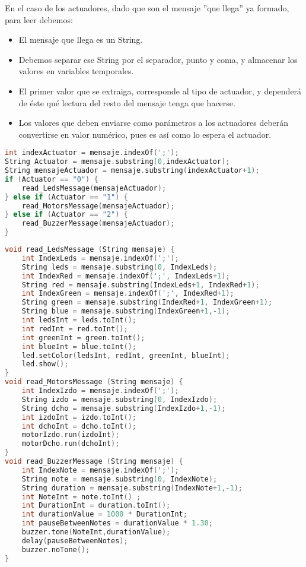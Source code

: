 En el caso de los actuadores, dado que son el mensaje ''que llega'' ya formado, para leer debemos:
\begin{itemize}
	\item El mensaje que llega es un String.
	\item Debemos separar ese String por el separador, punto y coma, y almacenar los valores en variables temporales. 
	\item El primer valor que se extraiga, corresponde al tipo de actuador, y dependerá de éste qué lectura del resto del mensaje tenga que hacerse. 
	\item Los valores que deben enviarse como parámetros a los actuadores deberán convertirse en valor numérico, pues es así como lo espera el actuador. 
\end{itemize} 
\begin{lstlisting}[language=C,caption={Decisión sobre los actuadores con el primer valor del mensaje},captionpos=b]
int indexActuator = mensaje.indexOf(';');
String Actuator = mensaje.substring(0,indexActuator);
String mensajeActuador = mensaje.substring(indexActuator+1);
if (Actuator == "0") {
	read_LedsMessage(mensajeActuador);
} else if (Actuator == "1") {
	read_MotorsMessage(mensajeActuador);
} else if (Actuator == "2") {
	read_BuzzerMessage(mensajeActuador);
}
\end{lstlisting}
\begin{lstlisting}[language=C,caption={Lectura de mensajes de los actuadores},captionpos=b]
void read_LedsMessage (String mensaje) {
	int IndexLeds = mensaje.indexOf(';');
	String leds = mensaje.substring(0, IndexLeds);
	int IndexRed = mensaje.indexOf(';', IndexLeds+1); 
	String red = mensaje.substring(IndexLeds+1, IndexRed+1);
	int IndexGreen = mensaje.indexOf(';', IndexRed+1);
	String green = mensaje.substring(IndexRed+1, IndexGreen+1);
	String blue = mensaje.substring(IndexGreen+1,-1); 
	int ledsInt = leds.toInt();
	int redInt = red.toInt();
	int greenInt = green.toInt();
	int blueInt = blue.toInt();
	led.setColor(ledsInt, redInt, greenInt, blueInt);
	led.show();
}	
void read_MotorsMessage (String mensaje) {
	int IndexIzdo = mensaje.indexOf(';');
	String izdo = mensaje.substring(0, IndexIzdo);
	String dcho = mensaje.substring(IndexIzdo+1,-1);	
	int izdoInt = izdo.toInt();
	int dchoInt = dcho.toInt();
	motorIzdo.run(izdoInt);
	motorDcho.run(dchoInt);
}
void read_BuzzerMessage (String mensaje) {
	int IndexNote = mensaje.indexOf(';');
	String note = mensaje.substring(0, IndexNote);  
	String duration = mensaje.substring(IndexNote+1,-1);
	int NoteInt = note.toInt() ;
	int DurationInt = duration.toInt();	
	int durationValue = 1000 * DurationInt;  
	int pauseBetweenNotes = durationValue * 1.30;
	buzzer.tone(NoteInt,durationValue);
	delay(pauseBetweenNotes);
	buzzer.noTone();
}	
\end{lstlisting}

